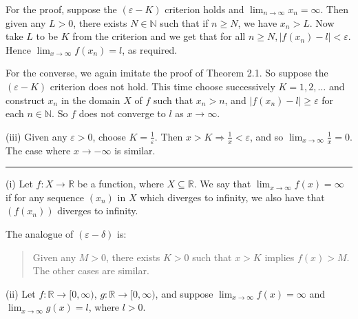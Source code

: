 \documentclass[letterpaper,10pt,english]{jupyterBook}
\begin{document}
For the proof, suppose the \((\varepsilon- K)\) criterion holds and \(\lim_{n\rightarrow\infty} x_{n} = \infty\). Then given any \(L > 0\), there exists \(N\in\mathbb{N}\) such that if \(n\geq N\), we have \(x_{n} > L\). Now take \(L\) to be \(K\) from the criterion and we get that for all \(n\geq N, |f(x_{n}) - l| < \varepsilon\). Hence \(\lim_{x \rightarrow \infty}f(x_{n}) = l\), as required.

For the converse, we again imitate the proof of Theorem 2.1. So suppose the \((\varepsilon-K)\) criterion does not hold. This time choose successively \(K = 1, 2, \ldots\) and construct \(x_{n}\) in the domain \(X\) of \(f\) such that \(x_{n} > n\), and \(|f(x_{n}) - l| \geq \varepsilon\) for each \(n\in\mathbb{N}\). So \(f\) does not converge to \(l\) as \(x\to\infty\).

\sphinxAtStartPar
(iii) Given any \(\varepsilon > 0\), choose \(K = \frac{1}{\varepsilon}\). Then \(x > K \Rightarrow \frac{1}{x} < \varepsilon\), and so \(\lim_{x\to\infty} \frac{1}{x}=0\). The case where \(x\to-\infty\) is similar.


\bigskip\hrule\bigskip


\sphinxAtStartPar
{\hyperref[\detokenize{Problems:id12}]{}}
(i) Let \(f:X\to\mathbb{R}\) be a function, where \(X\subseteq\mathbb{R}\). We say that \(\lim_{x \rightarrow \infty} f(x) = \infty\) if for any sequence \((x_{n})\) in \(X\) which diverges to infinity, we also have that \((f(x_{n}))\) diverges to infinity.

The analogue of \((\varepsilon - \delta)\) is:
\begin{quote}

\sphinxAtStartPar
Given any \(M > 0\), there exists \(K > 0\) such that \(x > K\) implies \(f(x) > M\).
The other cases are similar.
\end{quote}

\sphinxAtStartPar
(ii) Let \(f:\mathbb{R}\to[0,\infty)\), \(g:\mathbb{R}\to[0,\infty)\), and suppose \(\displaystyle\lim_{x\rightarrow\infty}f(x)=\infty\) and \(\displaystyle\lim_{x\rightarrow\infty}g(x)=l\), where \(l>0\).
\end{document}

